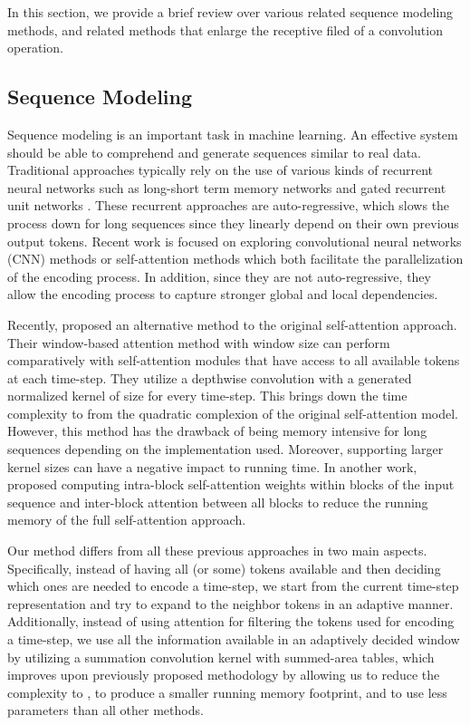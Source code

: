\documentclass{article}
\begin{document}
In this section, we provide a brief review over various related sequence modeling methods, and related methods that enlarge the receptive filed of a convolution operation.

\subsection{Sequence Modeling}
Sequence modeling is an important task in machine learning. 
An effective
system should be able to comprehend and generate sequences similar to real data. Traditional approaches typically rely on the use of various kinds of recurrent neural networks such as long-short term memory networks \cite{doi:10.1162/neco.1997.9.8.1735,DBLP:journals/corr/SutskeverVL14,li-etal-2016-persona,LI2018301} and gated recurrent unit networks \cite{DBLP:journals/corr/ChoMGBSB14,nabil-etal-2016-cufe}. These recurrent approaches are auto-regressive, which slows the process down for long sequences since they linearly depend on their own previous output tokens. Recent work is focused on exploring convolutional neural networks (CNN) methods \cite{DBLP:journals/corr/KalchbrennerESO16,gehring2017convolutional,wu2019pay} or self-attention methods \cite{vaswani2017attention,zhang-Etal:2018:ACL2018accelerating,DBLP:journals/corr/abs-1901-02860,kitaev2020reformer} which both facilitate the parallelization of the encoding process. 
In addition, since they are not auto-regressive, they allow the encoding process to capture stronger global and local dependencies.

Recently, \citet{wu2019pay} proposed an alternative method to the original self-attention approach. Their window-based attention method with window size  can perform comparatively with self-attention modules that have access to all available tokens at each time-step. They utilize a depthwise convolution with a generated  normalized kernel of size  for every time-step. This brings down the time complexity to  from the quadratic complexion of the original self-attention model. However, this method has the drawback of being memory intensive for long sequences depending on the implementation used. Moreover, supporting larger kernel sizes can have a negative impact to running time. In another work, \citet{DBLP:journals/corr/abs-1804-00857} proposed computing intra-block self-attention weights within blocks of the input sequence and inter-block attention between all blocks to reduce the running memory of the full self-attention approach.

Our method differs from all these previous approaches in two main aspects. Specifically, instead of having all (or some) tokens available and then deciding which ones are needed to encode a time-step, we start from the current time-step representation and try to expand to the neighbor tokens in an adaptive manner.  Additionally, instead of using attention for filtering the tokens used for encoding a time-step, we use all the information available in an adaptively decided window by utilizing a summation convolution kernel with summed-area tables, which improves upon previously proposed methodology by allowing us to reduce the complexity to , to produce a smaller running memory footprint, and to use less parameters than all other methods.
\end{document}
